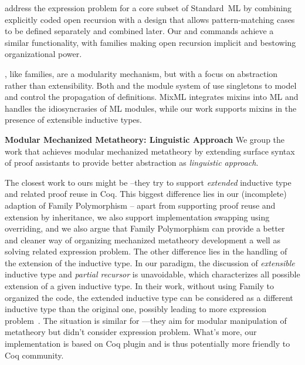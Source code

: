 \citet{bac2006} address the expression problem for a core subset of Standard~ML
by combining explicitly coded open recursion with a design that
allows pattern-matching cases to be defined separately and combined
later.
Our  and  commands achieve a similar
functionality, with families making open recursion implicit and
bestowing organizational power.

\!\!, like families, are a modularity mechanism,
but with a focus on abstraction rather than extensibility.
Both \TT and the module system of \citet{stohar2000} use singletons to model and
control the propagation of definitions.
\mbox{MixML} \cite{rosdre2013} integrates mixins into ML and handles the
idiosyncrasies of ML modules,
while our work supports mixins in the presence of extensible inductive types.



\ifShowOldWriting

\textbf{Modular Mechanized Metatheory: Linguistic Approach} We group the work that achieves modular mechanized metatheory by extending surface syntax of proof assistants to provide better abstraction as \textit{linguistic approach}. 

The closest work to ours might be \citet{boite2004proof}--they try to support \textit{extended} inductive type and related proof reuse in Coq. This biggest difference lies in our (incomplete) adaption of Family Polymorphism -- apart from supporting proof reuse and extension by inheritance, we also support implementation swapping using overriding, and we also argue that Family Polymorphism can provide a better and cleaner way of organizing mechanized metatheory development a well as solving related expression problem. The other difference lies in the handling of the extension of the inductive type. In our paradigm, the discussion of \textit{extensible} inductive type and \textit{partial recursor} is unavoidable, which characterizes all possible extension of a given inductive type. In their work, without using Family to organized the code, the extended inductive type can be considered as a different inductive type than the original one, possibly leading to more expression problem~\cite{wadler-ep}. The situation is similar for \citet{levin2003tinkertype}---they aim for modular manipulation of metatheory but didn't consider expression problem.  What's more, our implementation is based on Coq plugin and is thus potentially more friendly to Coq community.


